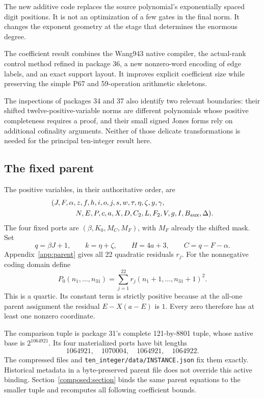 \documentclass[11pt,a4paper]{article}
\theoremstyle{definition}
\newcommand{\code}[1]{\ifmmode\text{\nolinkurl{#1}}\else\nolinkurl{#1}\fi}
\begin{document}
The new additive code replaces the source polynomial's
exponentially spaced digit positions. It is not an optimization
of a few gates in the final norm. It changes the exponent geometry
at the stage that determines the enormous degree.

The coefficient result combines the Wang943 native compiler,
the actual-rank control method refined in package 36, a new
nonzero-word encoding of edge labels, and an exact support
layout. It improves explicit coefficient size while preserving
the simple P67 and 59-operation arithmetic skeletons.

The inspections of packages 34 and 37 also identify two relevant
boundaries: their shifted twelve-positive-variable norms are
different polynomials whose positive completeness requires a
proof, and their small signed Jones forms rely on additional
cofinality arguments. Neither of those delicate transformations
is needed for the principal ten-integer result here.

\subsection{The fixed parent}
The positive variables, in their authoritative order, are
\[
\begin{split}
 &(J,F,\alpha,z,f,h,i,o,j,s,w,\tau,\eta,\zeta,y,\gamma,\\
 &\hspace{12mm}N,E,P,c,a,X,D,C_2,L,F_2,V,g,I,B_{\rm aux},\Delta).
\end{split}
\]
The four fixed ports are $(\beta,K_0,M_C,M_F)$, with $M_F$
already the shifted mask. Set
\[
 q=\beta J+1,\qquad k=\eta+\zeta,\qquad
 H=4a+3,\qquad C=q-F-\alpha.
\]
Appendix~\ref{app:parent} gives all 22 quadratic residuals $r_j$.
For the nonnegative coding domain define
\begin{equation}\label{eq:parent}
 P_0(n_1,\ldots,n_{31})=
 \sum_{j=1}^{22}r_j(n_1+1,\ldots,n_{31}+1)^2.
\end{equation}
This is a quartic. Its constant term is strictly positive because
at the all-one parent assignment the residual $E-X(a-E)$ is $1$.
Every zero therefore has at least one nonzero coordinate.

The comparison tuple is package 31's complete 121-by-8801
tuple, whose native base is $2^{1064921}$. Its four materialized
ports have bit lengths
\[
 1064921,\quad1070004,\quad1064921,\quad1064922.
\]
The compressed files and \code{ten_integer/data/INSTANCE.json}
fix them exactly. Historical metadata in a byte-preserved parent
file does not override this active binding.
Section~\ref{composed:section} binds the same parent equations to
the smaller tuple and recomputes all following coefficient bounds.
\end{document}
